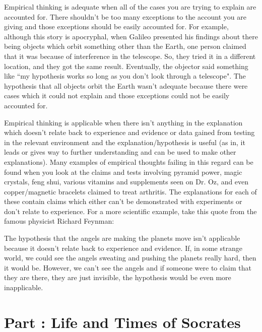 Empirical thinking is adequate when all of the cases you are trying to explain are accounted for. There shouldn't be too many exceptions to the account you are giving and those exceptions should be easily accounted for. For example, although this story is apocryphal, when Galileo presented his findings about there being objects which orbit something other than the Earth, one person claimed that it was because of interference in the telescope. So, they tried it in a different location, and they got the same result. Eventually, the objector said something like ``my hypothesis works so long as you don't look through a telescope". The hypothesis that all objects orbit the Earth wasn't adequate because there were cases which it could not explain and those exceptions could not be easily accounted for. 

Empirical thinking is applicable when there isn't anything in the explanation which doesn't relate back to experience and evidence or data gained from testing in the relevant environment and the explanation/hypothesis is useful (as in, it leads or gives way to further understanding and can be used to make other explanations). Many examples of empirical thoughts failing in this regard can be found when you look at the claims and tests involving pyramid power, magic crystals, feng shui, various vitamins and supplements seen on Dr. Oz, and even copper/magnetic bracelets claimed to treat arthritis. The explanations for each of these contain claims which either can't be demonstrated with experiments or don't relate to experience. For a more scientific example, take this quote from the famous physicist Richard Feynman:

 The hypothesis that the angels are making the planets move isn't applicable because it doesn't relate back to experience and evidence. If, in some strange world, we could see the angels sweating and pushing the planets really hard, then it would be. However, we can't see the angels and if someone were to claim that they are there, they are just invisible, the hypothesis would be even more inapplicable.


\chapter{Part \thechapcount: Life and Times of Socrates}\setcounter{seccount}{1}

